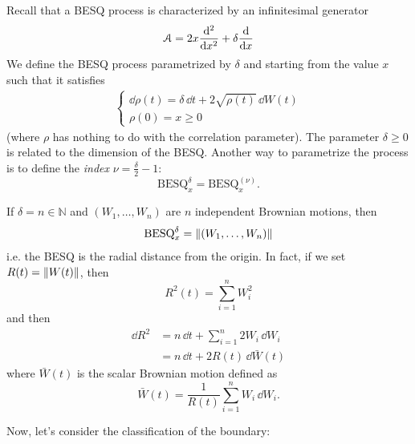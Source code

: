  Recall that a BESQ process is characterized by an infinitesimal generator
\begin{equation}
    \mathcal{A} = 2x\dv[2]{}{x} + \delta\dv{}{x}
\end{equation}
We define the BESQ process parametrized by $\delta$ and starting from the value $x$ such that it satisfies
\begin{align}
    \begin{cases}
    \dd\rho(t) = \delta\,\dd t + 2\sqrt{\rho(t)}\,\dd W(t) \\
    \rho(0) = x \ge 0
    \end{cases}
\end{align}
(where $\rho$ has nothing to do with the correlation parameter). The parameter $\delta\ge 0$ is related to the dimension of the BESQ. Another way to parametrize the process is to define the \emph{index} $\nu = \tfrac{\delta}{2}-1$:
\begin{equation*}
    \text{BESQ}^{\delta}_x = \text{BESQ}^{(\nu)}_x.
\end{equation*}
\begin{remark}
    If $\delta = n \in \mathbb{N}$ and $(W_1,\dots,W_n)$ are $n$ independent Brownian motions, then
    \begin{equation*}
        \text{BESQ}^{\delta}_x = \norm{(W_1,\dots,W_n)}
    \end{equation*}
    i.e. the BESQ is the radial distance from the origin. In fact, if we set $R(t) = \norm{W(t)}$, then
    \begin{equation*}
        R^2(t) = \sum_{i=1}^n W_i^2
    \end{equation*}
    and then
    \begin{align*}
        \dd R^2 &= n\,\dd t + \sum_{i=1}^n 2W_i\,\dd W_i \\
        &=
        n\,\dd t + 2R(t)\,\dd\bar{W}(t)
    \end{align*}
    where $\bar{W}(t)$ is the scalar Brownian motion defined as
    \begin{equation*}
        \bar{W}(t) = \frac{1}{R(t)}\sum_{i=1}^n W_i\,\dd W_i.
    \end{equation*}
\end{remark} %
Now, let's consider the classification of the boundary:
